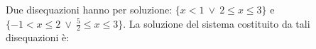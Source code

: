 Due disequazioni hanno per soluzione:
%
 $\{ \mbox{$x<1$} \ \vee \  \mbox{$2 \leq x \leq 3$}\}$ e
%
 $\{ \mbox{$-1<x \leq 2$} \ \vee \ \mbox{$\frac{5}{2} \leq x \leq 3$}\}$.
%
La soluzione del sistema costituito da tali disequazioni è: